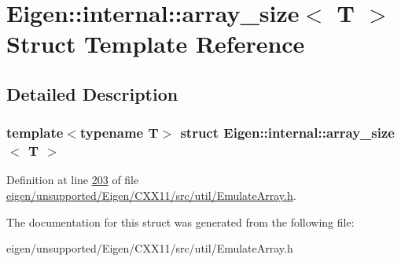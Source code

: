 \hypertarget{struct_eigen_1_1internal_1_1array__size}{}\section{Eigen\+:\+:internal\+:\+:array\+\_\+size$<$ T $>$ Struct Template Reference}
\label{struct_eigen_1_1internal_1_1array__size}


\subsection{Detailed Description}
\subsubsection*{template$<$typename T$>$\newline
struct Eigen\+::internal\+::array\+\_\+size$<$ T $>$}



Definition at line \hyperlink{eigen_2unsupported_2_eigen_2_c_x_x11_2src_2util_2_emulate_array_8h_source_l00203}{203} of file \hyperlink{eigen_2unsupported_2_eigen_2_c_x_x11_2src_2util_2_emulate_array_8h_source}{eigen/unsupported/\+Eigen/\+C\+X\+X11/src/util/\+Emulate\+Array.\+h}.



The documentation for this struct was generated from the following file\+:\begin{DoxyCompactItemize}
\item 
eigen/unsupported/\+Eigen/\+C\+X\+X11/src/util/\+Emulate\+Array.\+h\end{DoxyCompactItemize}

